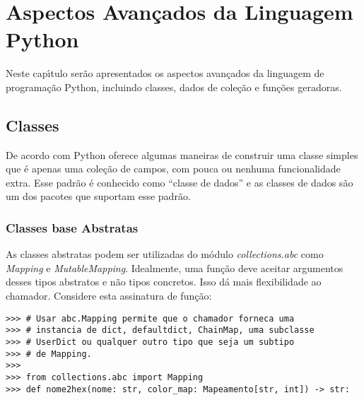 
\chapter{Aspectos Avan\c{c}ados da Linguagem Python}
Neste cap\'{\i}tulo ser\~{a}o apresentados os aspectos avan\c{c}ados da linguagem de programa\c{c}\~{a}o Python, incluindo classes, dados de cole\c{c}\~{a}o e fun\c{c}\~{o}es geradoras.

\section{Classes}
De acordo com \cite{Ramalho2022} Python oferece algumas maneiras de construir uma classe simples que \'{e} apenas uma cole\c{c}\~{a}o de campos, com pouca ou nenhuma funcionalidade extra. Esse padr\~{a}o \'{e} conhecido como \textquotedblleft{}classe de dados\textquotedblright{} \textemdash{} e as classes de dados s\~{a}o um dos pacotes que suportam esse padr\~{a}o.

	\subsection{Classes base Abstratas}
As classes abstratas podem ser utilizadas do m\'{o}dulo \textsl{collections.abc} como \textsl{Mapping} e \textsl{MutableMapping}. Idealmente, uma fun\c{c}\~{a}o deve aceitar argumentos desses tipos abstratos e n\~{a}o tipos concretos. Isso d\'{a} mais flexibilidade ao chamador. Considere esta assinatura de fun\c{c}\~{a}o:

\begin{lstlisting}
>>> # Usar abc.Mapping permite que o chamador forneca uma 
>>> # instancia de dict, defaultdict, ChainMap, uma subclasse 
>>> # UserDict ou qualquer outro tipo que seja um subtipo 
>>> # de Mapping.
>>>
>>> from collections.abc import Mapping
>>> def nome2hex(nome: str, color_map: Mapeamento[str, int]) -> str:
\end{lstlisting}

